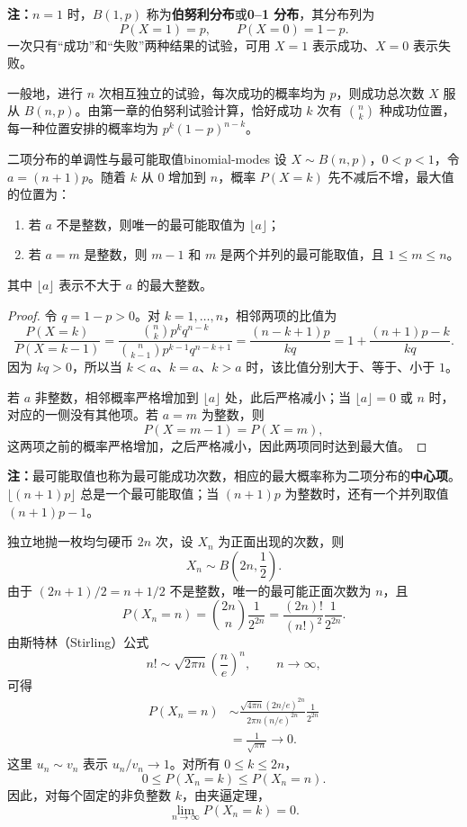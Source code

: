 \textbf{注：}\quad $n=1$ 时，$B(1,p)$ 称为\textbf{伯努利分布}或\textbf{0--1 分布}，其分布列为
\[
P(X=1)=p,\qquad P(X=0)=1-p.
\]
一次只有“成功”和“失败”两种结果的试验，可用 $X=1$ 表示成功、$X=0$ 表示失败。

一般地，进行 $n$ 次相互独立的试验，每次成功的概率均为 $p$，则成功总次数 $X$ 服从 $B(n,p)$。由第一章的伯努利试验计算，恰好成功 $k$ 次有 $\binom nk$ 种成功位置，每一种位置安排的概率均为 $p^k(1-p)^{n-k}$。

\begin{proposition}{二项分布的单调性与最可能取值}{binomial-modes}
设 $X\sim B(n,p)$，$0<p<1$，令 $a=(n+1)p$。随着 $k$ 从 $0$ 增加到 $n$，概率 $P(X=k)$ 先不减后不增，最大值的位置为：
\begin{enumerate}
    \item 若 $a$ 不是整数，则唯一的最可能取值为 $\lfloor a\rfloor$；
    \item 若 $a=m$ 是整数，则 $m-1$ 和 $m$ 是两个并列的最可能取值，且 $1\leq m\leq n$。
\end{enumerate}
其中 $\lfloor a\rfloor$ 表示不大于 $a$ 的最大整数。
\end{proposition}

\begin{proof}
令 $q=1-p>0$。对 $k=1,\ldots,n$，相邻两项的比值为
\[
\frac{P(X=k)}{P(X=k-1)}
=\frac{\binom nk p^kq^{n-k}}
{\binom n{k-1}p^{k-1}q^{n-k+1}}
=\frac{(n-k+1)p}{kq}
=1+\frac{(n+1)p-k}{kq}.
\]
因为 $kq>0$，所以当 $k<a$、$k=a$、$k>a$ 时，该比值分别大于、等于、小于 $1$。

若 $a$ 非整数，相邻概率严格增加到 $\lfloor a\rfloor$ 处，此后严格减小；当 $\lfloor a\rfloor=0$ 或 $n$ 时，对应的一侧没有其他项。若 $a=m$ 为整数，则
\[
P(X=m-1)=P(X=m),
\]
这两项之前的概率严格增加，之后严格减小，因此两项同时达到最大值。
\end{proof}

\textbf{注：}\quad 最可能取值也称为最可能成功次数，相应的最大概率称为二项分布的\textbf{中心项}。$\lfloor(n+1)p\rfloor$ 总是一个最可能取值；当 $(n+1)p$ 为整数时，还有一个并列取值 $(n+1)p-1$。

\begin{example}[均匀硬币的中心项]
独立地抛一枚均匀硬币 $2n$ 次，设 $X_n$ 为正面出现的次数，则
\[
X_n\sim B\left(2n,\frac12\right).
\]
由于 $(2n+1)/2=n+1/2$ 不是整数，唯一的最可能正面次数为 $n$，且
\[
P(X_n=n)=\binom{2n}{n}\frac1{2^{2n}}
=\frac{(2n)!}{(n!)^2}\frac1{2^{2n}}.
\]
由斯特林（Stirling）公式
\[
n!\sim\sqrt{2\pi n}\left(\frac ne\right)^n,
\qquad n\to\infty,
\]
可得
\[
\begin{aligned}
P(X_n=n)
&\sim
\frac{\sqrt{4\pi n}(2n/e)^{2n}}
{2\pi n(n/e)^{2n}}\frac1{2^{2n}}\\
&=\frac1{\sqrt{\pi n}}\longrightarrow0.
\end{aligned}
\]
这里 $u_n\sim v_n$ 表示 $u_n/v_n\to1$。对所有 $0\leq k\leq2n$，
\[
0\leq P(X_n=k)\leq P(X_n=n).
\]
因此，对每个固定的非负整数 $k$，由夹逼定理，
\[
\lim_{n\to\infty}P(X_n=k)=0.
\]
\end{example}

